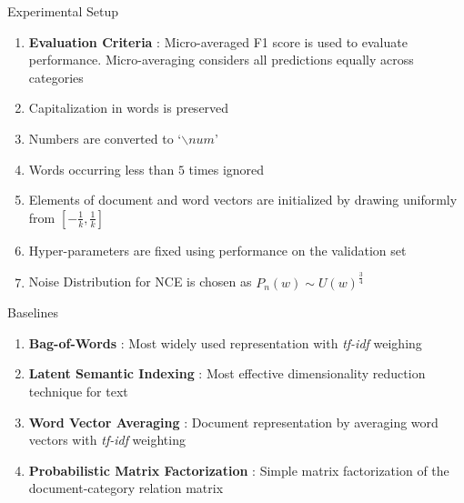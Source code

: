 \documentclass[10pt]{beamer}
\begin{document}
\begin{frame}{Experimental Setup}
\begin{enumerate}
	\vfill\item<1-> \textbf{Evaluation Criteria} : Micro-averaged F1 score is used to evaluate performance. Micro-averaging considers all predictions equally across categories
	\vfill\item<2-> Capitalization in words is preserved
	\vfill\item<3-> Numbers are converted to `$\backslash num$'
	\vfill\item<4-> Words occurring less than $5$ times ignored
	\vfill\item<5-> Elements of document and word vectors are initialized by drawing uniformly from $[-\frac{1}{k}, \frac{1}{k}]$ 
	\vfill\item<6-> Hyper-parameters are fixed using performance on the validation set
	\vfill\item<7-> Noise Distribution for NCE is chosen as $P_{n}(w) \sim U(w)^{\frac{3}{4}}$
\end{enumerate}
\end{frame}

\begin{frame}{Baselines}
\begin{enumerate}
	\vfill\item<1-> \textbf{Bag-of-Words} : Most widely used representation with \emph{tf-idf} weighing
	\vfill\item<2-> \textbf{Latent Semantic Indexing} : Most effective dimensionality reduction technique for text
	\vfill\item<3-> \textbf{Word Vector Averaging} : Document representation by averaging word vectors with \emph{tf-idf} weighting
	\vfill\item<4-> \textbf{Probabilistic Matrix Factorization} : Simple matrix factorization of the document-category relation matrix
\end{enumerate}
\end{frame}
\end{document}
